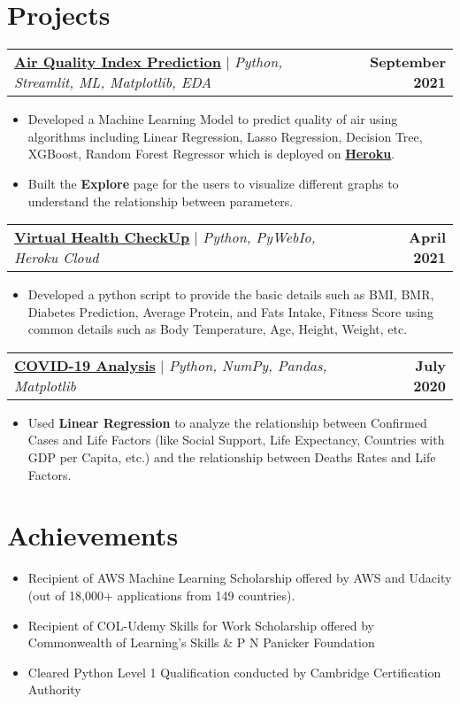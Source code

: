 \documentclass[letterpaper,11pt]{article}
\makeatletter
\newcommand{\resumeProjectItem}[1]{
  \item\small{
    {#1 \vspace{-5pt}}
  }
}
\newcommand{\resumeProjectHeading}[2]{
    \item
    \begin{tabular*}{1.001\textwidth}{l@{\extracolsep{\fill}}r}
      \small#1 & \textbf{\small #2}\\
    \end{tabular*}\vspace{-2pt}
}
\newcommand{\resumeItemListStart}{\begin{itemize}}
\newcommand{\resumeItemListEnd}{\end{itemize}\vspace{-5pt}}
\makeatother
\begin{document}
  
\section{Projects}
\vspace{-10pt}
    \resumeProjectSubHeadingListStart
      \resumeProjectHeading
          {\href{https://github.com/noor12401/Projects/tree/main/AQI}{\color{blue}\textbf{Air Quality Index Prediction}} $|$ \emph{Python, Streamlit, ML, Matplotlib, EDA}}{September 2021}
          \resumeItemListStart
          \resumeProjectItem {Developed a Machine Learning Model to predict quality of air using algorithms including Linear Regression, Lasso Regression, Decision Tree, XGBoost, Random Forest Regressor which is deployed on \textbf{\href{https://airqualityindexcheckerr.herokuapp.com/}{\color{blue}Heroku}}.}
          \resumeProjectItem{Built the \textbf{Explore} page for the users to visualize different graphs to understand the relationship between parameters.}
          \resumeItemListEnd
          \vspace{-24pt}
          \resumeProjectSubHeadingListStart
      \resumeProjectHeading
          {\href{https://github.com/noor12401/Virtual-Health-Check-Up}{\color{blue}\textbf{Virtual Health CheckUp}} $|$ \emph{Python, PyWebIo, Heroku Cloud}}{April 2021}
          \resumeItemListStart
          \resumeProjectItem {Developed a python script to provide the basic details such as BMI, BMR, Diabetes Prediction, Average Protein, and Fats Intake, Fitness Score using common details such as Body Temperature, Age, Height, Weight, etc.}
          \resumeItemListEnd
          \vspace{-12pt}
          \resumeProjectSubHeadingListStart
      \resumeProjectHeading
          {\href{https://github.com/noor12401/COVID-19-Analysis}{\color{blue}\textbf{COVID-19 Analysis}} $|$ \emph{Python, NumPy, Pandas, Matplotlib}}{July 2020}
          \resumeItemListStart
          \resumeProjectItem {Used \textbf{Linear Regression} to analyze the relationship between Confirmed Cases and Life Factors (like Social Support, Life Expectancy, Countries with GDP per Capita, etc.) and the relationship between Deaths Rates and Life Factors.}
          \resumeItemListEnd
    \resumeProjectSubHeadingListEnd
    \vspace{-15pt}

\section{Achievements}
    \resumeItemListStart
    \item Recipient of AWS Machine Learning Scholarship offered by AWS and Udacity (out of 18,000+ applications from 149 countries).
    \vspace{-5pt}
    \item Recipient of COL-Udemy Skills for Work Scholarship offered by Commonwealth of Learning's Skills & P N Panicker Foundation
    \vspace{-5pt}
    \item Cleared Python Level 1 Qualification conducted by Cambridge Certification Authority
    \resumeItemListEnd
    \vspace{-12pt}
\end{document}
